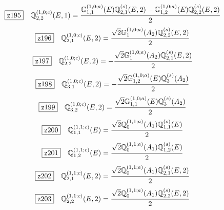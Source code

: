 \documentclass[fleqn,10pt,landscape]{jsarticle}
\begin{document}
\begin{dmath*}
\hspace*{3mm}\fbox{z195}\quad \mathbb{Q}_{2,2}^{(1,0;c)}(E,1)=\frac{\mathbb{G}_{1,1}^{(1,0;a)}(E) \mathbb{Q}_{2,1}^{(s)}(E,2) - \mathbb{G}_{1,2}^{(1,0;a)}(E) \mathbb{Q}_{2,2}^{(s)}(E,2)}{2}
\end{dmath*}
\begin{dmath*}
\hspace*{3mm}\fbox{z196}\quad \mathbb{Q}_{2,1}^{(1,0;c)}(E,2)=\frac{\sqrt{2} \mathbb{G}_{1}^{(1,0;a)}(A_{2}) \mathbb{Q}_{2,2}^{(s)}(E,2)}{2}
\end{dmath*}
\begin{dmath*}
\hspace*{3mm}\fbox{z197}\quad \mathbb{Q}_{2,2}^{(1,0;c)}(E,2)=- \frac{\sqrt{2} \mathbb{G}_{1}^{(1,0;a)}(A_{2}) \mathbb{Q}_{2,1}^{(s)}(E,2)}{2}
\end{dmath*}
\begin{dmath*}
\hspace*{3mm}\fbox{z198}\quad \mathbb{Q}_{3,1}^{(1,0;c)}(E,2)=- \frac{\sqrt{2} \mathbb{G}_{1,2}^{(1,0;a)}(E) \mathbb{Q}_{3}^{(s)}(A_{2})}{2}
\end{dmath*}
\begin{dmath*}
\hspace*{3mm}\fbox{z199}\quad \mathbb{Q}_{3,2}^{(1,0;c)}(E,2)=\frac{\sqrt{2} \mathbb{G}_{1,1}^{(1,0;a)}(E) \mathbb{Q}_{3}^{(s)}(A_{2})}{2}
\end{dmath*}
\begin{dmath*}
\hspace*{3mm}\fbox{z200}\quad \mathbb{Q}_{1,1}^{(1,1;c)}(E)=\frac{\sqrt{2} \mathbb{Q}_{0}^{(1,1;a)}(A_{1}) \mathbb{Q}_{1,1}^{(s)}(E)}{2}
\end{dmath*}
\begin{dmath*}
\hspace*{3mm}\fbox{z201}\quad \mathbb{Q}_{1,2}^{(1,1;c)}(E)=\frac{\sqrt{2} \mathbb{Q}_{0}^{(1,1;a)}(A_{1}) \mathbb{Q}_{1,2}^{(s)}(E)}{2}
\end{dmath*}
\begin{dmath*}
\hspace*{3mm}\fbox{z202}\quad \mathbb{Q}_{2,1}^{(1,1;c)}(E,2)=\frac{\sqrt{2} \mathbb{Q}_{0}^{(1,1;a)}(A_{1}) \mathbb{Q}_{2,1}^{(s)}(E,2)}{2}
\end{dmath*}
\begin{dmath*}
\hspace*{3mm}\fbox{z203}\quad \mathbb{Q}_{2,2}^{(1,1;c)}(E,2)=\frac{\sqrt{2} \mathbb{Q}_{0}^{(1,1;a)}(A_{1}) \mathbb{Q}_{2,2}^{(s)}(E,2)}{2}
\end{dmath*}
\end{document}

